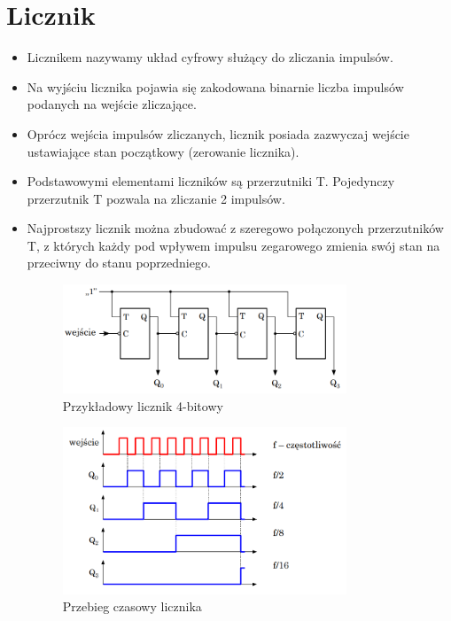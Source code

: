 \pagebreak

\section{Licznik}

\begin{itemize}
    \item Licznikem nazywamy układ cyfrowy służący do zliczania impulsów.
    \item Na wyjściu licznika pojawia się zakodowana binarnie liczba impulsów podanych na wejście zliczające. 
    \item Oprócz wejścia impulsów zliczanych, licznik posiada zazwyczaj wejście ustawiające stan początkowy (zerowanie licznika).
    \item Podstawowymi elementami liczników są przerzutniki T. Pojedynczy przerzutnik T pozwala na zliczanie 2 impulsów. 
    \item Najprostszy licznik można zbudować z szeregowo połączonych przerzutników T, z których każdy pod wpływem impulsu zegarowego zmienia swój stan na przeciwny do stanu poprzedniego.
    \begin{figure}[H]
        \centering
        \includegraphics[width=0.8\textwidth]{img/schemes/schemat_licznika_4bitowego.png}
        \caption{Przykładowy licznik 4-bitowy}
        \label{licznik:przykladowy_licznik_4bitowy}
    \end{figure}
    \begin{figure}[H]
        \centering
        \includegraphics[width=0.8\textwidth]{img/schemes/licznik_przebieg.png}
        \caption{Przebieg czasowy licznika}
        \label{licznik:przebieg}
    \end{figure}
\end{itemize}

